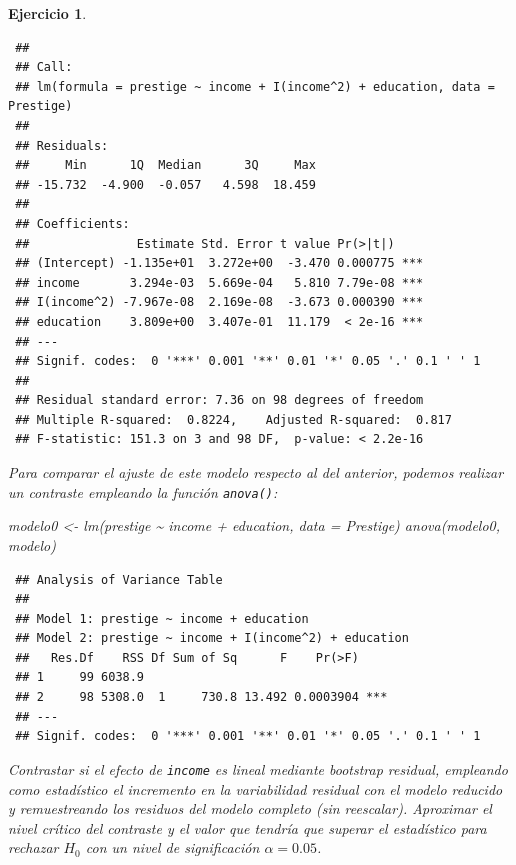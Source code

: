\documentclass[
]{book}
\newenvironment{Shaded}{\begin{snugshade}}{\end{snugshade}}
\newcommand{\AttributeTok}[1]{\textcolor[rgb]{0.77,0.63,0.00}{#1}}
\newcommand{\FunctionTok}[1]{\textcolor[rgb]{0.00,0.00,0.00}{#1}}
\newcommand{\NormalTok}[1]{#1}
\newcommand{\OtherTok}[1]{\textcolor[rgb]{0.56,0.35,0.01}{#1}}
\newcommand{\SpecialCharTok}[1]{\textcolor[rgb]{0.00,0.00,0.00}{#1}}
\theoremstyle{break}
\newtheorem{exercise}{Ejercicio}[chapter]
\theoremstyle{nonumberplain}
\begin{document}
\begin{exercise}
\begin{verbatim}
 ## 
 ## Call:
 ## lm(formula = prestige ~ income + I(income^2) + education, data = Prestige)
 ## 
 ## Residuals:
 ##     Min      1Q  Median      3Q     Max 
 ## -15.732  -4.900  -0.057   4.598  18.459 
 ## 
 ## Coefficients:
 ##               Estimate Std. Error t value Pr(>|t|)    
 ## (Intercept) -1.135e+01  3.272e+00  -3.470 0.000775 ***
 ## income       3.294e-03  5.669e-04   5.810 7.79e-08 ***
 ## I(income^2) -7.967e-08  2.169e-08  -3.673 0.000390 ***
 ## education    3.809e+00  3.407e-01  11.179  < 2e-16 ***
 ## ---
 ## Signif. codes:  0 '***' 0.001 '**' 0.01 '*' 0.05 '.' 0.1 ' ' 1
 ## 
 ## Residual standard error: 7.36 on 98 degrees of freedom
 ## Multiple R-squared:  0.8224,    Adjusted R-squared:  0.817 
 ## F-statistic: 151.3 on 3 and 98 DF,  p-value: < 2.2e-16
\end{verbatim}

Para comparar el ajuste de este modelo respecto al del anterior, podemos
realizar un contraste empleando la función \texttt{anova()}:

\begin{Shaded}
\begin{Highlighting}[]
\NormalTok{modelo0 }\OtherTok{\textless{}{-}} \FunctionTok{lm}\NormalTok{(prestige }\SpecialCharTok{\textasciitilde{}}\NormalTok{ income }\SpecialCharTok{+}\NormalTok{ education, }\AttributeTok{data =}\NormalTok{ Prestige)}
\FunctionTok{anova}\NormalTok{(modelo0, modelo)}
\end{Highlighting}
\end{Shaded}

\begin{verbatim}
 ## Analysis of Variance Table
 ## 
 ## Model 1: prestige ~ income + education
 ## Model 2: prestige ~ income + I(income^2) + education
 ##   Res.Df    RSS Df Sum of Sq      F    Pr(>F)    
 ## 1     99 6038.9                                  
 ## 2     98 5308.0  1     730.8 13.492 0.0003904 ***
 ## ---
 ## Signif. codes:  0 '***' 0.001 '**' 0.01 '*' 0.05 '.' 0.1 ' ' 1
\end{verbatim}

Contrastar si el efecto de \texttt{income} es lineal mediante bootstrap residual,
empleando como estadístico el incremento en la variabilidad residual con el
modelo reducido y remuestreando los residuos del modelo completo (sin reescalar).
Aproximar el nivel crítico del contraste y el valor que tendría que superar el
estadístico para rechazar \(H_0\) con un nivel de significación \(\alpha = 0.05\).
\end{exercise}
\end{document}
